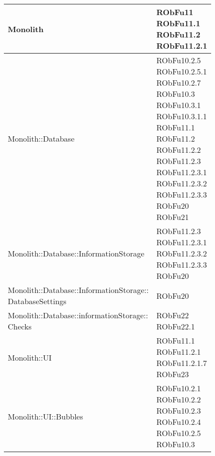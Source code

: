 \begin{center}
\begin{longtable}{|
*{1}{>{\centering\arraybackslash}m{7.5cm}|}
*{1}{>{\centering\arraybackslash}m{2.5cm}|}}
Monolith & \makecell{RObFu11
\\RObFu11.1
\\RObFu11.2
\\RObFu11.2.1
\\}\\\hline
Monolith::Database & \makecell{RObFu10.2.5
\\RObFu10.2.5.1
\\RObFu10.2.7
\\RObFu10.3
\\RObFu10.3.1
\\RObFu10.3.1.1
\\RObFu11.1
\\RObFu11.2
\\RObFu11.2.2
\\RObFu11.2.3
\\RObFu11.2.3.1
\\RObFu11.2.3.2
\\RObFu11.2.3.3
\\RObFu20
\\RObFu21
\\}\\\hline
Monolith::Database::InformationStorage & \makecell{RObFu11.2.3
\\RObFu11.2.3.1
\\RObFu11.2.3.2
\\RObFu11.2.3.3
\\RObFu20
\\}\\\hline
\makecell[l]{Monolith::Database::InformationStorage:: \\ \hfill DatabaseSettings} & \makecell{RObFu20
\\}\\\hline
\makecell[l]{Monolith::Database::informationStorage:: \\ \hfill Checks} & \makecell{RObFu22
\\RObFu22.1
\\}\\\hline
Monolith::UI & \makecell{RObFu11.1
\\RObFu11.2.1
\\RObFu11.2.1.7
\\RObFu23
\\}\\\hline
Monolith::UI::Bubbles & \makecell{RObFu10.2.1
\\RObFu10.2.2
\\RObFu10.2.3
\\RObFu10.2.4
\\RObFu10.2.5
\\RObFu10.3
}
\end{longtable}
\end{center}
